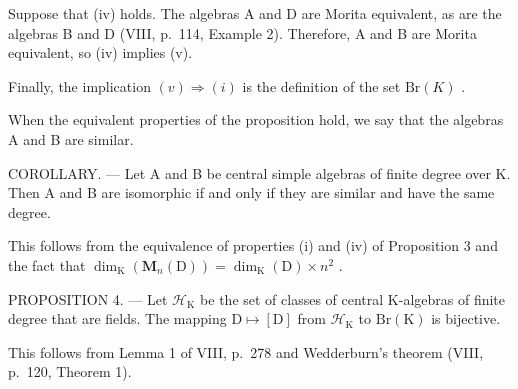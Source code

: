 Suppose that (iv) holds. The algebras A and D are Morita equivalent, as are the algebras B and D (VIII, p.~114, Example 2). Therefore, A and B are Morita equivalent, so (iv) implies (v).

Finally, the implication \((v)\Rightarrow(i)\) is the definition of the set \(\mathrm{Br}(K)\) .

When the equivalent properties of the proposition hold, we say that the algebras A and B are similar.

COROLLARY. --- Let A and B be central simple algebras of finite degree over K. Then A and B are isomorphic if and only if they are similar and have the same degree.

This follows from the equivalence of properties (i) and (iv) of Proposition 3 and the fact that \(\dim_{\mathrm{K}}(\mathbf{M}_n(\mathrm{D})) = \dim_{\mathrm{K}}(\mathrm{D}) \times n^2\) .

PROPOSITION 4. --- Let \(\mathcal{H}_{\mathrm{K}}\) be the set of classes of central K-algebras of finite degree that are fields. The mapping \(\mathrm{D} \mapsto [\mathrm{D}]\) from \(\mathcal{H}_{\mathrm{K}}\) to \(\mathrm{Br}(\mathrm{K})\) is bijective.

This follows from Lemma 1 of VIII, p.~278 and Wedderburn's theorem (VIII, p.~120, Theorem 1).

